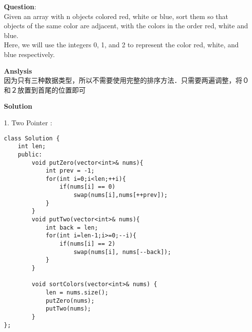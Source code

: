 \begin{description}
    \item{\textbf{Question}}:\\%
		Given an array with n objects colored red, white or blue, sort them so that objects of the same color are adjacent, with the colors in the order red, white and blue.\\
		Here, we will use the integers 0, 1, and 2 to represent the color red, white, and blue respectively.\\

    \item{\textbf{Anslysis}}\\
		因为只有三种数据类型，所以不需要使用完整的排序方法．只需要两遍调整，将０和２放置到首尾的位置即可\\

    \item{\textbf{Solution}}\\
	\item{1. Two Pointer} : \\
		\begin{lstlisting}
class Solution {
	int len;
	public:
		void putZero(vector<int>& nums){
			int prev = -1;
			for(int i=0;i<len;++i){
				if(nums[i] == 0)
					swap(nums[i],nums[++prev]);
			}
		}
		void putTwo(vector<int>& nums){
			int back = len;
			for(int i=len-1;i>=0;--i){
				if(nums[i] == 2)
					swap(nums[i], nums[--back]);
			}
		}

		void sortColors(vector<int>& nums) {
			len = nums.size();
			putZero(nums);
			putTwo(nums);
		}
};
		\end{lstlisting}

\end{description}


